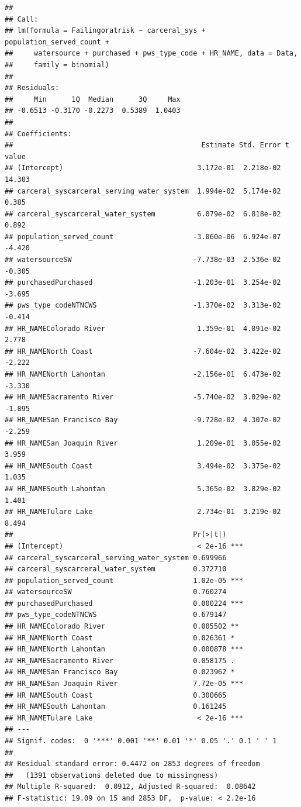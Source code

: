 \documentclass[
]{article}
\begin{document}
\begin{verbatim}
## 
## Call:
## lm(formula = Failingoratrisk ~ carceral_sys + population_served_count + 
##     watersource + purchased + pws_type_code + HR_NAME, data = Data, 
##     family = binomial)
## 
## Residuals:
##     Min      1Q  Median      3Q     Max 
## -0.6513 -0.3170 -0.2273  0.5389  1.0403 
## 
## Coefficients:
##                                             Estimate Std. Error t value
## (Intercept)                                3.172e-01  2.218e-02  14.303
## carceral_syscarceral_serving_water_system  1.994e-02  5.174e-02   0.385
## carceral_syscarceral_water_system          6.079e-02  6.818e-02   0.892
## population_served_count                   -3.060e-06  6.924e-07  -4.420
## watersourceSW                             -7.738e-03  2.536e-02  -0.305
## purchasedPurchased                        -1.203e-01  3.254e-02  -3.695
## pws_type_codeNTNCWS                       -1.370e-02  3.313e-02  -0.414
## HR_NAMEColorado River                      1.359e-01  4.891e-02   2.778
## HR_NAMENorth Coast                        -7.604e-02  3.422e-02  -2.222
## HR_NAMENorth Lahontan                     -2.156e-01  6.473e-02  -3.330
## HR_NAMESacramento River                   -5.740e-02  3.029e-02  -1.895
## HR_NAMESan Francisco Bay                  -9.728e-02  4.307e-02  -2.259
## HR_NAMESan Joaquin River                   1.209e-01  3.055e-02   3.959
## HR_NAMESouth Coast                         3.494e-02  3.375e-02   1.035
## HR_NAMESouth Lahontan                      5.365e-02  3.829e-02   1.401
## HR_NAMETulare Lake                         2.734e-01  3.219e-02   8.494
##                                           Pr(>|t|)    
## (Intercept)                                < 2e-16 ***
## carceral_syscarceral_serving_water_system 0.699966    
## carceral_syscarceral_water_system         0.372710    
## population_served_count                   1.02e-05 ***
## watersourceSW                             0.760274    
## purchasedPurchased                        0.000224 ***
## pws_type_codeNTNCWS                       0.679147    
## HR_NAMEColorado River                     0.005502 ** 
## HR_NAMENorth Coast                        0.026361 *  
## HR_NAMENorth Lahontan                     0.000878 ***
## HR_NAMESacramento River                   0.058175 .  
## HR_NAMESan Francisco Bay                  0.023962 *  
## HR_NAMESan Joaquin River                  7.72e-05 ***
## HR_NAMESouth Coast                        0.300665    
## HR_NAMESouth Lahontan                     0.161245    
## HR_NAMETulare Lake                         < 2e-16 ***
## ---
## Signif. codes:  0 '***' 0.001 '**' 0.01 '*' 0.05 '.' 0.1 ' ' 1
## 
## Residual standard error: 0.4472 on 2853 degrees of freedom
##   (1391 observations deleted due to missingness)
## Multiple R-squared:  0.0912, Adjusted R-squared:  0.08642 
## F-statistic: 19.09 on 15 and 2853 DF,  p-value: < 2.2e-16
\end{verbatim}
\end{document}
